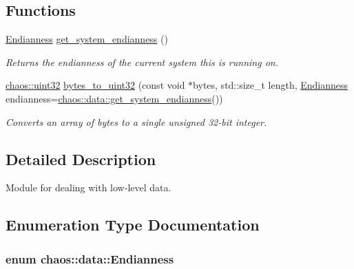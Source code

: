 \subsection*{Functions}
\begin{DoxyCompactItemize}
\item 
\hypertarget{namespacechaos_1_1data_a853118d28d026784faad6673bbcf526f}{\hyperlink{namespacechaos_1_1data_adb2657d50c0b84cdc1153001031bbf3f}{Endianness} \hyperlink{namespacechaos_1_1data_a853118d28d026784faad6673bbcf526f}{get\-\_\-system\-\_\-endianness} ()}\label{namespacechaos_1_1data_a853118d28d026784faad6673bbcf526f}

\begin{DoxyCompactList}\small\item\em Returns the endianness of the current system this is running on. \end{DoxyCompactList}\item 
\hyperlink{namespacechaos_a8641b3ae4551f0b35570d4f9f4ec22d9}{chaos\-::uint32} \hyperlink{namespacechaos_1_1data_af4310ad815f14c278c83c5abb3abc251}{bytes\-\_\-to\-\_\-uint32} (const void $\ast$bytes, std\-::size\-\_\-t length, \hyperlink{namespacechaos_1_1data_adb2657d50c0b84cdc1153001031bbf3f}{Endianness} endianness=\hyperlink{namespacechaos_1_1data_a853118d28d026784faad6673bbcf526f}{chaos\-::data\-::get\-\_\-system\-\_\-endianness}())
\begin{DoxyCompactList}\small\item\em Converts an array of bytes to a single unsigned 32-\/bit integer. \end{DoxyCompactList}\end{DoxyCompactItemize}


\subsection{Detailed Description}
Module for dealing with low-\/level data. 

\subsection{Enumeration Type Documentation}
\hypertarget{namespacechaos_1_1data_adb2657d50c0b84cdc1153001031bbf3f}{
\subsubsection[{Endianness}]{\setlength{\rightskip}{0pt plus 5cm}enum {\bf chaos\-::data\-::\-Endianness}}}\label{namespacechaos_1_1data_adb2657d50c0b84cdc1153001031bbf3f}


